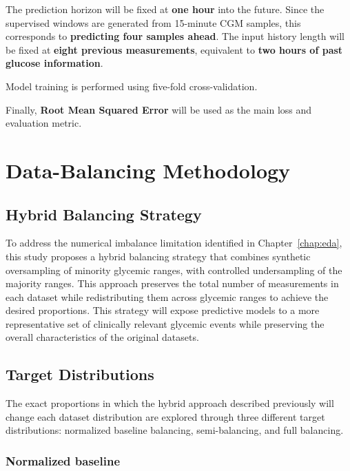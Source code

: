 The prediction horizon will be fixed at \textbf{one hour} into the future. Since the supervised windows are generated from 15-minute CGM samples, this corresponds to \textbf{predicting four samples ahead}. The input history length will be fixed at \textbf{eight previous measurements}, equivalent to \textbf{two hours of past glucose information}.

Model training is performed using five-fold cross-validation. 

Finally, \textbf{Root Mean Squared Error} will be used as the main loss and evaluation metric.

\section{Data-Balancing Methodology}
\label{sec:data-balancing methodology}

\subsection{Hybrid Balancing Strategy}
\label{subsec:experimental_methodology_hybrid_strategy}

To address the numerical imbalance limitation identified in Chapter~\ref{chap:eda}, this study proposes a hybrid balancing strategy that combines synthetic oversampling of minority glycemic ranges, with controlled undersampling of the majority ranges. This approach preserves the total number of measurements in each dataset while redistributing them across glycemic ranges to achieve the desired proportions. This strategy will expose predictive models to a more representative set of clinically relevant glycemic events while preserving the overall characteristics of the original datasets.

\subsection{Target Distributions}
\label{subsec:target_distributions}

The exact proportions in which the hybrid approach described previously will change each dataset distribution are explored through three different target distributions: normalized baseline balancing, semi-balancing, and full balancing.

\subsubsection{Normalized baseline}
\label{subsubsec:normalized_baseline}

